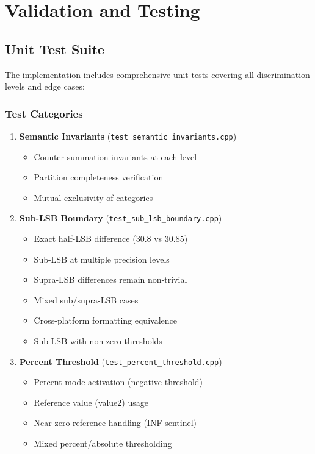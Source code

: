 \section{Validation and Testing}
\label{sec:validation}

\subsection{Unit Test Suite}

The implementation includes comprehensive unit tests covering all discrimination levels and edge cases:

\subsubsection{Test Categories}

\begin{enumerate}
    \item \textbf{Semantic Invariants} (\texttt{test\_semantic\_invariants.cpp})
    \begin{itemize}
        \item Counter summation invariants at each level
        \item Partition completeness verification
        \item Mutual exclusivity of categories
    \end{itemize}

    \item \textbf{Sub-LSB Boundary} (\texttt{test\_sub\_lsb\_boundary.cpp})
    \begin{itemize}
        \item Exact half-LSB difference (30.8 vs 30.85)
        \item Sub-LSB at multiple precision levels
        \item Supra-LSB differences remain non-trivial
        \item Mixed sub/supra-LSB cases
        \item Cross-platform formatting equivalence
        \item Sub-LSB with non-zero thresholds
    \end{itemize}

    \item \textbf{Percent Threshold} (\texttt{test\_percent\_threshold.cpp})
    \begin{itemize}
        \item Percent mode activation (negative threshold)
        \item Reference value (value2) usage
        \item Near-zero reference handling (INF sentinel)
        \item Mixed percent/absolute thresholding
    \end{itemize}


\end{enumerate}
